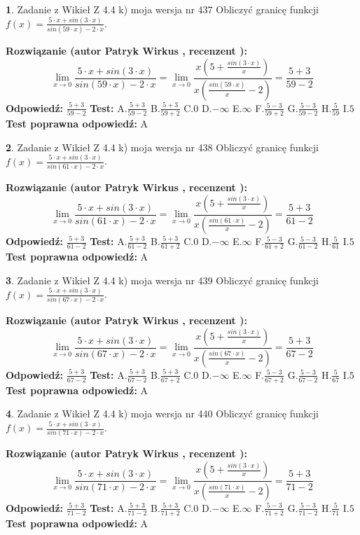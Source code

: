 \documentclass[12pt, a4paper]{article}
\theoremstyle{definition} %
\newtheorem{zad}{}
\newcommand{\zadStart}[1]{\begin{zad}#1\newline}
\newcommand{\zadStop}{\end{zad}}
\newcommand{\rozwStart}[2]{\noindent \textbf{Rozwiązanie (autor #1 , recenzent #2): }\newline}
\newcommand{\rozwStop}{\newline}
\newcommand{\odpStart}{\noindent \textbf{Odpowiedź:}\newline}
\newcommand{\odpStop}{\newline}
\newcommand{\testStart}{\noindent \textbf{Test:}\newline}
\newcommand{\testStop}{\newline}
\newcommand{\kluczStart}{\noindent \textbf{Test poprawna odpowiedź:}\newline}
\newcommand{\kluczStop}{\newline}
\begin{document}
\zadStart{Zadanie z Wikieł Z 4.4 k) moja wersja nr 437}
Obliczyć granicę funkcji $f(x)=\frac{5\cdot x +sin(3\cdot x)}{sin(59\cdot x) -2\cdot x}$.
\zadStop
\rozwStart{Patryk Wirkus}{}
$$\lim\limits_{x\to 0}\frac{5\cdot x +sin(3\cdot x)}{sin(59\cdot x) -2\cdot x}
=\lim\limits_{x\to 0}\frac{x(5+\frac{sin(3\cdot x)}{x})}{x(\frac{sin(59\cdot x)}{x}-2)}
=\frac{5+3}{59-2}$$
\rozwStop
\odpStart
$\frac{5+3}{59-2}$
\odpStop
\testStart
A.$\frac{5+3}{59-2}$
B.$\frac{5+3}{59+2}$
C.$0$
D.$-\infty$
E.$\infty$
F.$\frac{5-3}{59+2}$
G.$\frac{5-3}{59-2}$
H.$\frac{5}{59}$
I.$5$
\testStop
\kluczStart
A
\kluczStop



\zadStart{Zadanie z Wikieł Z 4.4 k) moja wersja nr 438}
Obliczyć granicę funkcji $f(x)=\frac{5\cdot x +sin(3\cdot x)}{sin(61\cdot x) -2\cdot x}$.
\zadStop
\rozwStart{Patryk Wirkus}{}
$$\lim\limits_{x\to 0}\frac{5\cdot x +sin(3\cdot x)}{sin(61\cdot x) -2\cdot x}
=\lim\limits_{x\to 0}\frac{x(5+\frac{sin(3\cdot x)}{x})}{x(\frac{sin(61\cdot x)}{x}-2)}
=\frac{5+3}{61-2}$$
\rozwStop
\odpStart
$\frac{5+3}{61-2}$
\odpStop
\testStart
A.$\frac{5+3}{61-2}$
B.$\frac{5+3}{61+2}$
C.$0$
D.$-\infty$
E.$\infty$
F.$\frac{5-3}{61+2}$
G.$\frac{5-3}{61-2}$
H.$\frac{5}{61}$
I.$5$
\testStop
\kluczStart
A
\kluczStop



\zadStart{Zadanie z Wikieł Z 4.4 k) moja wersja nr 439}
Obliczyć granicę funkcji $f(x)=\frac{5\cdot x +sin(3\cdot x)}{sin(67\cdot x) -2\cdot x}$.
\zadStop
\rozwStart{Patryk Wirkus}{}
$$\lim\limits_{x\to 0}\frac{5\cdot x +sin(3\cdot x)}{sin(67\cdot x) -2\cdot x}
=\lim\limits_{x\to 0}\frac{x(5+\frac{sin(3\cdot x)}{x})}{x(\frac{sin(67\cdot x)}{x}-2)}
=\frac{5+3}{67-2}$$
\rozwStop
\odpStart
$\frac{5+3}{67-2}$
\odpStop
\testStart
A.$\frac{5+3}{67-2}$
B.$\frac{5+3}{67+2}$
C.$0$
D.$-\infty$
E.$\infty$
F.$\frac{5-3}{67+2}$
G.$\frac{5-3}{67-2}$
H.$\frac{5}{67}$
I.$5$
\testStop
\kluczStart
A
\kluczStop



\zadStart{Zadanie z Wikieł Z 4.4 k) moja wersja nr 440}
Obliczyć granicę funkcji $f(x)=\frac{5\cdot x +sin(3\cdot x)}{sin(71\cdot x) -2\cdot x}$.
\zadStop
\rozwStart{Patryk Wirkus}{}
$$\lim\limits_{x\to 0}\frac{5\cdot x +sin(3\cdot x)}{sin(71\cdot x) -2\cdot x}
=\lim\limits_{x\to 0}\frac{x(5+\frac{sin(3\cdot x)}{x})}{x(\frac{sin(71\cdot x)}{x}-2)}
=\frac{5+3}{71-2}$$
\rozwStop
\odpStart
$\frac{5+3}{71-2}$
\odpStop
\testStart
A.$\frac{5+3}{71-2}$
B.$\frac{5+3}{71+2}$
C.$0$
D.$-\infty$
E.$\infty$
F.$\frac{5-3}{71+2}$
G.$\frac{5-3}{71-2}$
H.$\frac{5}{71}$
I.$5$
\testStop
\kluczStart
A
\kluczStop
\end{document}
